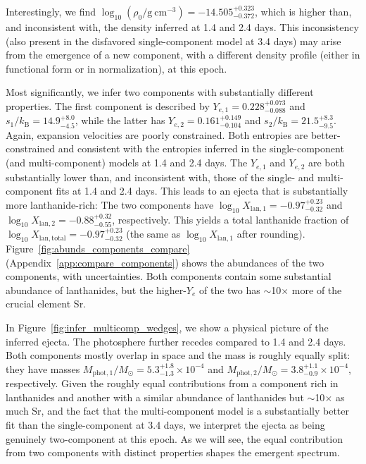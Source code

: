 \documentclass[twocolumn,twocolappendix]{aastex63}
\begin{document}
Interestingly, we find $\log_{10} (\rho_0 / \mathrm{g~cm^{-3}}) = -14.505^{+0.323}_{-0.372}$, which is higher than, and inconsistent with, the density inferred at 1.4 and 2.4 days. This inconsistency (also present in the disfavored single-component model at 3.4 days) may arise from the emergence of a new component, with a different density profile (either in functional form or in normalization), at this epoch. 

Most significantly, we infer two components with substantially different properties. The first component is described by $Y_{e,1} = 0.228^{+0.073}_{-0.088}$ and $s_1 / k_{\mathrm{B}} = 14.9^{+8.0}_{-4.5}$, while the latter has $Y_{e,2} = 0.161^{+0.149}_{-0.104}$ and $s_2 / k_{\mathrm{B}} = 21.5^{+8.3}_{-9.5}$. Again, expansion velocities are poorly constrained. Both entropies are better-constrained and consistent with the entropies inferred in the single-component (and multi-component) models at 1.4 and 2.4 days. The $Y_{e,1}$ and $Y_{e,2}$ are both substantially lower than, and inconsistent with, those of the single- and multi-component fits at 1.4 and 2.4 days. This leads to an ejecta that is substantially more lanthanide-rich: The two components have $\log_{10} X_{\mathrm{lan},1} = -0.97^{+0.23}_{-0.32}$ and $\log_{10} X_{\mathrm{lan},2} = -0.88^{+0.32}_{-0.55}$, respectively. This yields a total lanthanide fraction of $\log_{10} X_{\mathrm{lan,total}} = -0.97^{+0.23}_{-0.32}$ (the same as $\log_{10} X_{\mathrm{lan},1}$ after rounding). Figure~\ref{fig:abunds_components_compare} (Appendix~\ref{app:compare_components}) shows the abundances of the two components, with uncertainties. Both components contain some substantial abundance of lanthanides, but the higher-$Y_e$ of the two has $\sim$10$\times$ more of the crucial element Sr.

In Figure~\ref{fig:infer_multicomp_wedges}, we show a physical picture of the inferred ejecta. The photosphere further recedes compared to 1.4 and 2.4 days. Both components mostly overlap in space and the mass is roughly equally split: they have  masses $M_{\mathrm{phot},1}/M_{\odot} = 5.3^{+1.8}_{-1.3} \times 10^{-4}$ and $M_{\mathrm{phot},2}/M_{\odot} = 3.8^{+1.1}_{-0.9} \times 10^{-4}$, respectively. Given the roughly equal contributions from a component rich in lanthanides and another with a similar abundance of lanthanides but $\sim$10$\times$ as much Sr, and the fact that the multi-component model is a substantially better fit than the single-component at 3.4 days, we interpret the ejecta as being genuinely two-component at this epoch. As we will see, the equal contribution from two components with distinct properties shapes the emergent spectrum. 
\end{document}
